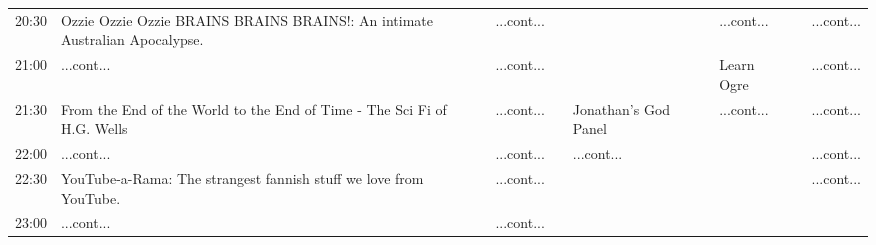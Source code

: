 \documentclass{scrreprt}
\begin{document}
\begin{landscape}
\begin{tabular}{c||p{25mm}|p{25mm}|p{25mm}|p{25mm}|p{25mm}|p{25mm}|p{25mm}|p{25mm}|p{25mm}|}
20:30&\cellcolor[gray]{0.514710} Ozzie Ozzie Ozzie BRAINS BRAINS BRAINS!: An intimate Australian Apocalypse.&&\cellcolor[gray]{0.877898} ...cont...&&&&\cellcolor[gray]{0.941412} ...cont...&&\cellcolor[gray]{0.603771} ...cont...\\
21:00&\cellcolor[gray]{0.514710} ...cont...&&\cellcolor[gray]{0.877898} ...cont...&&&&\cellcolor[gray]{0.894481} Learn Ogre&&\cellcolor[gray]{0.603771} ...cont...\\
21:30&\cellcolor[gray]{0.918110} From the End of the World to the End of Time - The Sci Fi of H.G. Wells&&\cellcolor[gray]{0.877898} ...cont...&&\cellcolor[gray]{0.813638} Jonathan's God Panel&&\cellcolor[gray]{0.894481} ...cont...&&\cellcolor[gray]{0.603771} ...cont...\\
22:00&\cellcolor[gray]{0.918110} ...cont...&&\cellcolor[gray]{0.877898} ...cont...&&\cellcolor[gray]{0.813638} ...cont...&&&&\cellcolor[gray]{0.603771} ...cont...\\
22:30&\cellcolor[gray]{0.817831} YouTube-a-Rama: The strangest fannish stuff we love from YouTube.&&\cellcolor[gray]{0.877898} ...cont...&&&&&&\cellcolor[gray]{0.603771} ...cont...\\
23:00&\cellcolor[gray]{0.817831} ...cont...&&\cellcolor[gray]{0.877898} ...cont...&&&&&&\\\end{tabular}

\end{landscape}
\end{document}
